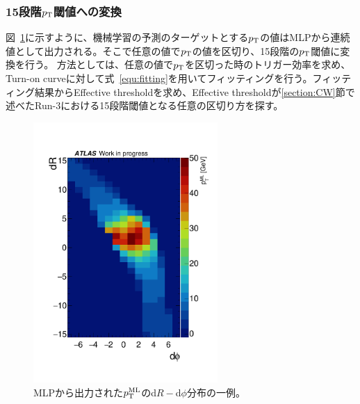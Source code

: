 \subsubsection{15段階\texorpdfstring{$p_{\rm{T}}$}{TEXT}閾値への変換}
図~\ref{fig:all_output}に示すように、機械学習の予測のターゲットとする$p_{\rm{T}}$の値はMLPから連続値として出力される。そこで任意の値で$p_{\rm{T}}$の値を区切り、15段階の$p_{\rm{T}}$閾値に変換を行う。
方法としては、任意の値で$p_{\rm{T}}$を区切った時のトリガー効率を求め、Turn-on curveに対して式~\eqref{equ:fitting}を用いてフィッティングを行う。フィッティング結果からEffective thresholdを求め、Effective thresholdが\ref{section:CW}節で述べたRun-3における15段階閾値となる任意の区切り方を探す。
\begin{figure}[tb]
  \centering
  \hspace*{-1cm}
  \includegraphics[clip, width=7cm]{fig/4/data_phi0_roi33_output_re.pdf}
  \caption{MLPから出力された$p_{\rm{T}}^{\rm{ML}}$のd$R-$d$\phi$分布の一例。}
  \label{fig:all_output}
\end{figure}

